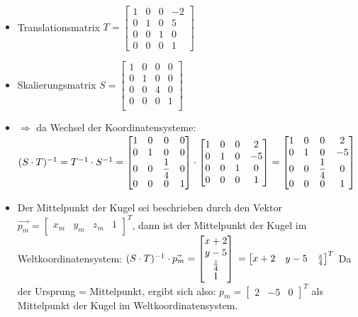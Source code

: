 \subsubsection{}
\begin{itemize}
	\item Translationsmatrix $T = \begin{bmatrix}
		1 & 0 & 0 & -2\\
		0 & 1 & 0 & 5\\
		0 & 0 & 1 & 0\\
		0 & 0 & 0 & 1
	\end{bmatrix}
	$
	
	\item Skalierungsmatrix $S = \begin{bmatrix}
	
	1 & 0 & 0 & 0\\
	0 & 1 & 0 & 0\\
	0 & 0 & 4 & 0\\
	0 & 0 & 0 & 1\\
	\end{bmatrix}$
	
	\item[] $\Rightarrow$ da Wechsel der Koordinatensysteme: $(S \cdot T)^{-1} = T^{-1} \cdot S^{-1} \\= \begin{bmatrix}
	1 & 0 & 0 & 0\\
	0 &1 &0 &0\\
	0 &0 &\dfrac{1}{4} &0\\
	0 &0 &0 &1
	\end{bmatrix} \cdot \begin{bmatrix}
	1 & 0 & 0 & 2\\
	0 & 1 & 0 & -5\\
	0 & 0 & 1 & 0\\
	0 & 0 & 0 & 1
	\end{bmatrix} = \begin{bmatrix}
	1 & 0 & 0 & 2\\
	0 & 1 & 0 & -5\\
	0 & 0 & \dfrac{1}{4} & 0\\
	0 & 0 & 0 & 1
	\end{bmatrix}$ 
	\item Der Mittelpunkt der Kugel sei beschrieben durch den Vektor $\vec{p_m} = \begin{bmatrix}
	x_m & y_m & z_m & 1
	\end{bmatrix}^T$, dann ist der Mittelpunkt der Kugel im Weltkoordinatensystem:
	$(S \cdot T)^{-1}\cdot \vec{p_m}
		= \begin{bmatrix}
		x+2 \\
		y-5 \\
		\frac{z}{4} \\
		1
		\end{bmatrix}\\ = \begin{bmatrix}
		x+2 & y-5 & \frac{z}{4}
		\end{bmatrix}^T$
		Da der Ursprung = Mittelpunkt, ergibt sich also: $p_m =  \begin{bmatrix}
		2 & -5 & 0
		\end{bmatrix}^T$ als Mittelpunkt der Kugel im Weltkoordinatensystem.
\end{itemize}

